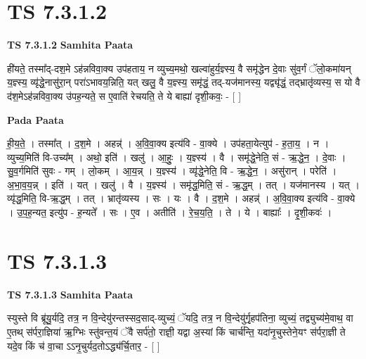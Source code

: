 \documentclass[17pt]{extarticle}
\begin{document}
\section*{ TS 7.3.1.2 }

\textbf{TS 7.3.1.2 } \newline
\textbf{Samhita Paata} \newline

ही॑यते॒ तस्मा᳚द्-दश॒मे ऽह॑न्नविवा॒क्य उप॑हताय॒ न व्युच्य॒मथो॒ खल्वा॑हुर्य॒ज्ञ्स्य॒ वै समृ॑द्धेन दे॒वाः सु॑व॒र्गं ॅलो॒कमा॑यन् य॒ज्ञ्स्य॒ व्यृ॑द्धे॒नासु॑रा॒न् परा॑ऽभावय॒न्निति॒ यत् खलु॒ वै य॒ज्ञ्स्य॒ समृ॑द्धं॒ तद्-यज॑मानस्य॒ यद्व्यृ॑द्धं॒ तद्भ्रातृ॑व्यस्य॒ स यो वै द॑श॒मेऽह॑न्नविवा॒क्य उ॑पह॒न्यते॒ स ए॒वाति॑ रेचयति॒ ते ये बाह्या॑ दृशी॒कवः॒ - [  ] \newline

\textbf{Pada Paata} \newline

ही॒य॒ते॒ । तस्मा᳚त् । द॒श॒मे । अहन्न्॑ । अ॒वि॒वा॒क्य इत्य॑वि - वा॒क्ये । उप॑हता॒येत्युप॑ - ह॒ता॒य॒ । न । व्युच्य॒मिति॑ वि-उच्य᳚म् । अथो॒ इति॑ । खलु॑ । आ॒हुः॒ । य॒ज्ञ्स्य॑ । वै । समृ॑द्धे॒नेति॒ सं - ऋ॒द्धे॒न॒ । दे॒वाः । सु॒व॒र्गमिति॑ सुवः - गम् । लो॒कम् । आ॒य॒न्न् । य॒ज्ञ्स्य॑ । व्यृ॑द्धे॒नेति॒ वि - ऋ॒द्धे॒न॒ । असु॑रान् । परेति॑ । अ॒भा॒व॒य॒न्न् । इति॑ । यत् । खलु॑ । वै । य॒ज्ञ्स्य॑ । समृ॑द्ध॒मिति॒ सं - ऋ॒द्ध॒म् । तत् । यज॑मानस्य । यत् । व्यृ॑द्ध॒मिति॒ वि-ऋ॒द्ध॒म् । तत् । भ्रातृ॑व्यस्य । सः । यः । वै । द॒श॒मे । अहन्न्॑ । अ॒वि॒वा॒क्य इत्य॑वि - वा॒क्ये । उ॒प॒ह॒न्यत॒ इत्यु॑प - ह॒न्यते᳚ । सः । ए॒व । अतीति॑ । रे॒च॒य॒ति॒ । ते । ये । बाह्याः᳚ । दृ॒शी॒कवः॑ ।  \newline




\section*{ TS 7.3.1.3 }

\textbf{TS 7.3.1.3 } \newline
\textbf{Samhita Paata} \newline

स्युस्ते वि ब्रू॑यु॒र्यदि॒ तत्र॒ न वि॒न्देयु॑रन्तस्सद॒साद्-व्युच्यं॒ ॅयदि॒ तत्र॒ न वि॒न्देयु॑र्गृ॒हप॑तिना॒ व्युच्यं॒ तद्व्युच्य॑मे॒वाथ॒ वा ए॒तथ् स॑र्परा॒ज्ञिया॑ ऋ॒ग्भिः स्तु॑वन्त॒यं ॅवै सर्प॑तो॒ राज्ञी॒ यद्वा अ॒स्यां किं चार्च॑न्ति॒ यदा॑नृ॒चुस्तेने॒यꣳ स॑र्परा॒ज्ञी ते यदे॒व किं च॑ वा॒चा ऽऽनृ॒चुर्यद॒तोऽद्ध्य॑र्चि॒तार॒ - [  ] \newline
\end{document}
